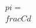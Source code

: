 \documentclass[preview]{standalone}
\begin{document}
\begin{align*}
\quad\\pi = \quad\\frac{C}{d}
\end{align*}
\end{document}
